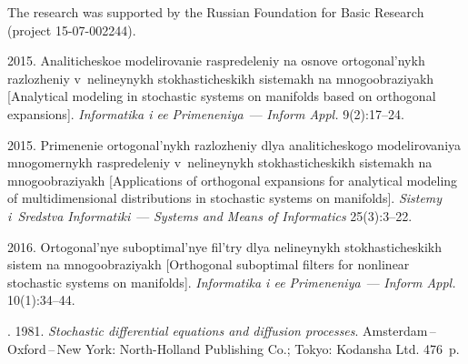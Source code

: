 

\vspace*{-12pt}

\Ack
\noindent
The research was supported by the Russian Foundation for Basic Research 
(project 15-07-002244).



  \begin{multicols}{2}

\renewcommand{\bibname}{\protect\rmfamily References}

{\small\frenchspacing
 {%
 \begin{thebibliography}{99}


 2015.
Analiticheskoe modelirovanie raspredeleniy na osnove ortogonal'nykh 
razlozheniy v~ne\-li\-ney\-nykh stokhasticheskikh sistemakh na mnogoobraziyakh 
[Analytical modeling in stochastic systems on manifolds based on orthogonal 
expansions]. \textit{Informatika i ee Primeneniya}~--- \textit{Inform Appl.} 
9(2):17--24.


 2015.
Primenenie ortogonal'nykh raz\-lo\-zhe\-niy dlya analiticheskogo modelirovaniya 
mno\-go\-mer\-nykh raspredeleniy v~nelineynykh stokhasticheskikh sistemakh na 
mnogoobraziyakh [Applications of orthogonal expansions for analytical modeling 
of multidimensional distributions in stochastic systems on manifolds].
\textit{Sistemy i~Sredstva Informatiki}~--- \textit{Systems and Means of Informatics}
 25(3):3--22.

 2016.
Ortogonal'nye suboptimal'nye fil'try dlya nelineynykh stokhasticheskikh 
sistem na mno\-go\-ob\-ra\-zi\-yakh [Orthogonal suboptimal filters for nonlinear 
stochastic systems on manifolds].
 \textit{Informatika i ee Primeneniya}~--- \textit{Inform Appl.}  
 10(1):34--44.
 
. 1981. 
\textit{Stochastic differential equations and diffusion processes}. 
Amsterdam\,--\,Oxford\,--\,New York: North-Holland Publishing Co.; 
Tokyo: Kodansha Ltd. 476~p.


\end{thebibliography}}}
\end{multicols}
